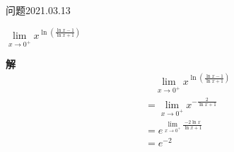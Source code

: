 \begin{mybox}{问题2021.03.13}
	
	\qquad $\lim\limits_{x \to 0^+} x^{\ln(\frac{\ln x-1}{\ln x+1})}$
\end{mybox}
\noindent
\textbf{解}
\begin{align*}
	&\quad\lim\limits_{x \to 0^+} x^{\ln(\frac{\ln x-1}{\ln x+1})}\\
	&=\lim\limits_{x \to 0^+} x^{-\frac{2}{\ln x+1}}\\
	&=e^{\lim\limits_{x\to 0^+}\frac{-2\ln x}{\ln x+1}}\\
	&=e^{-2}
\end{align*}